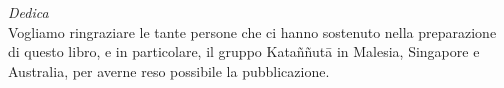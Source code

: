 
\vspace*{4\baselineskip}

{\centering

\begin{minipage}{0.9\linewidth}
\centering\small
\textit{Dedica}\\[0.4\baselineskip]
Vogliamo ringraziare le tante persone che ci hanno sostenuto nella preparazione di questo libro, e in particolare, il gruppo Kataññutā in Malesia, Singapore e Australia, per averne reso possibile la pubblicazione.

\end{minipage}

}
